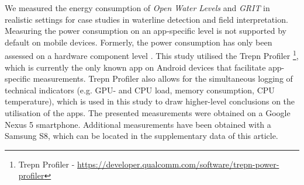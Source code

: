 \documentclass[review]{elsarticle}
\begin{document}
We measured the energy consumption of \textit{Open Water Levels} and \textit{\gls{GRIT}} in realistic settings for case studies in waterline detection and field interpretation. Measuring the power consumption on an app-specific level is not supported by default on mobile devices. Formerly, the power consumption has only been assessed on a hardware component level \cite{Carroll2010}. This study utilised the Trepn Profiler \footnote{Trepn Profiler - \url{https://developer.qualcomm.com/software/trepn-power-profiler}}, which is currently the only known app on Android devices that facilitate app-specific measurements. Trepn Profiler also allows for the simultaneous logging of technical indicators (e.g. \gls{GPU}- and \gls{CPU} load, memory consumption, \gls{CPU} temperature), which is used in this study to draw higher-level conclusions on the utilisation of the apps. The presented measurements were obtained on a Google Nexus 5 smartphone. Additional measurements have been obtained with a Samsung S8, which can be located in the supplementary data of this article.
\end{document}
